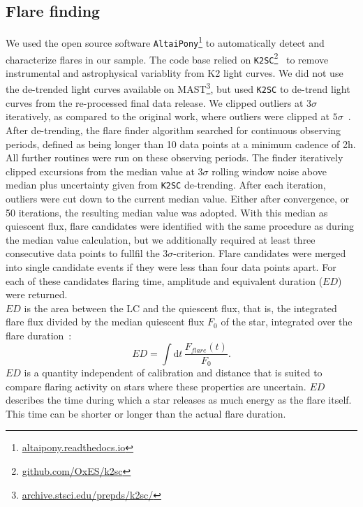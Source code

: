 \documentclass{aa}
\begin{document}
\subsection{Flare finding}
We used the open source software \texttt{AltaiPony}\footnote{\url{altaipony.readthedocs.io}} to automatically detect and characterize flares in our sample. The code base relied on \texttt{K2SC}\footnote{\url{github.com/OxES/k2sc}}~\citep{aigrain_k2sc_2016} to remove instrumental and astrophysical variablity from K2 light curves. We did not use the de-trended light curves available on MAST\footnote{\url{archive.stsci.edu/prepds/k2sc/}}, but used \texttt{K2SC} to de-trend light curves from the re-processed final data release. We clipped outliers at $3\sigma$ iteratively, as compared to the original work, where outliers were clipped at $5\sigma$~\citep{aigrain_k2sc_2016}.
\\
After de-trending, the flare finder algorithm searched for continuous observing periods, defined as being longer than 10 data points at a minimum cadence of 2\;h. All further routines were run on these observing periods. The finder iteratively clipped excursions from the median value at $3\sigma$ rolling window noise above median plus uncertainty given from \texttt{K2SC} de-trending. After each iteration, outliers were cut down to the current median value. Either after convergence, or 50 iterations, the resulting median value was adopted. With this median as quiescent flux, flare candidates were identified with the same procedure as during the median value calculation, but we additionally required at least three consecutive data points to fullfil the $3\sigma$-criterion. Flare candidates were merged into single candidate events if they were less than four data points apart. For each of these candidates flaring time, amplitude and equivalent duration ($ED$) were returned.
\\
$ED$ is the area between the LC and the quiescent flux, that is, the integrated flare flux divided by the median quiescent flux $F_0$ of the star, integrated over the flare duration~\citep{hunt-walker_most_2012}:
\begin{equation}
\label{05_ED}
ED=\displaystyle \int \mathrm dt\, \frac{F_{flare}(t)}{F_0}.
\end{equation}
$ED$ is a quantity independent of calibration and distance that is suited to compare flaring activity on stars where these properties are uncertain. $ED$ describes the time during which a star releases as much energy as the flare itself. This time can be shorter or longer than the actual flare duration. 
\end{document}
